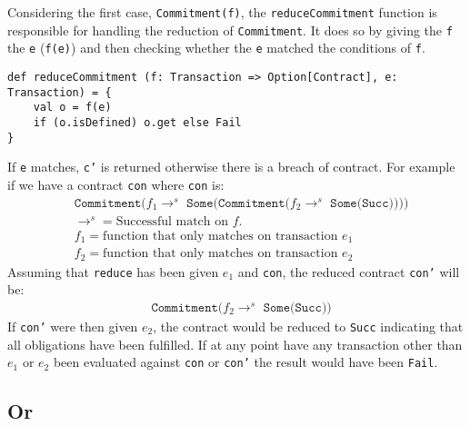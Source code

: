 \documentclass{ituthesis}
\begin{document}
Considering the first case, \texttt{Commitment(f)}, the \texttt{reduceCommitment} function is responsible for handling the reduction of \texttt{Commitment}. It does so by giving the \texttt{f} the \texttt{e} (\texttt{f(e)}) and then checking whether the \texttt{e} matched the conditions of \texttt{f}.
\begin{lstlisting}
def reduceCommitment (f: Transaction => Option[Contract], e: Transaction) = {
    val o = f(e)
    if (o.isDefined) o.get else Fail
}
\end{lstlisting}
If \texttt{e} matches, \texttt{c'} is returned otherwise there is a breach of contract. For example if we have a contract \texttt{con} where \texttt{con} is:
\begin{align*}
&\texttt{Commitment($f_1 \rightarrow^s$ Some(Commitment($f_2 \rightarrow^s$ Some(Succ))))} \\
&\rightarrow^s = \text{Successful match on $f$.} \\
&f_1 = \text{function that only matches on transaction }e_1 \\
&f_2 = \text{function that only matches on transaction }e_2
\end{align*}
Assuming that \texttt{reduce} has been given $e_1$ and \texttt{con}, the reduced contract \texttt{con'} will be:
\begin{align*}
&\texttt{Commitment($f_2 \rightarrow^s$ Some(Succ))}
\end{align*}
If \texttt{con'} were then given $e_2$, the contract would be reduced to \texttt{Succ} indicating that all obligations have been fulfilled. If at any point have any transaction other than $e_1$ or $e_2$ been evaluated against \texttt{con} or \texttt{con'} the result would have been \texttt{Fail}.

\subsection{Or}
\end{document}
